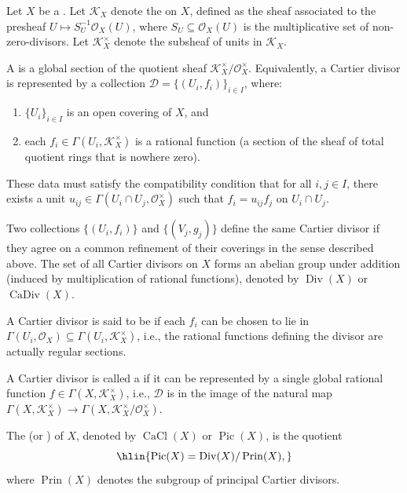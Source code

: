 \begin{definition} \label{definition:cartier_divisor_on_a_scheme}
Let $X$ be a . Let $\mathcal{K}_X$ denote the  on $X$, defined as the sheaf associated to the presheaf $U \mapsto S_U^{-1}\mathcal{O}_X(U)$, where $S_U \subseteq \mathcal{O}_X(U)$ is the multiplicative set of non-zero-divisors. Let $\mathcal{K}_X^\times$ denote the subsheaf of units in $\mathcal{K}_X$.

A  is a global section of the quotient sheaf $\mathcal{K}_X^\times / \mathcal{O}_X^\times$. Equivalently, a Cartier divisor is represented by a collection $\mathcal{D} = \{(U_i, f_i)\}_{i \in I}$, where:
\begin{enumerate}
    \item $\{U_i\}_{i \in I}$ is an open covering of $X$, and
    \item each $f_i \in \Gamma(U_i, \mathcal{K}_X^\times)$ is a rational function (a section of the sheaf of total quotient rings that is nowhere zero).
\end{enumerate}

These data must satisfy the compatibility condition that for all $i, j \in I$, there exists a unit $u_{ij} \in \Gamma(U_i \cap U_j, \mathcal{O}_X^\times)$ such that $f_i = u_{ij} f_j$ on $U_i \cap U_j$.

Two collections $\{(U_i, f_i)\}$ and $\{(V_j, g_j)\}$ define the same Cartier divisor if they agree on a common refinement of their coverings in the sense described above. The set of all Cartier divisors on $X$ forms an abelian group under addition (induced by multiplication of rational functions), denoted by $\operatorname{Div}(X)$ or $\operatorname{CaDiv}(X)$.

A Cartier divisor is said to be  if each $f_i$ can be chosen to lie in $\Gamma(U_i, \mathcal{O}_X) \subseteq \Gamma(U_i, \mathcal{K}_X^\times)$, i.e., the rational functions defining the divisor are actually regular sections.

A Cartier divisor is called a  if it can be represented by a single global rational function $f \in \Gamma(X, \mathcal{K}_X^\times)$, i.e., $\mathcal{D}$ is in the image of the natural map $\Gamma(X, \mathcal{K}_X^\times) \to \Gamma(X, \mathcal{K}_X^\times / \mathcal{O}_X^\times)$.

The  (or ) of $X$, denoted by $\operatorname{CaCl}(X)$ or $\operatorname{Pic}(X)$, is the quotient
$$\hlin{\operatorname{Pic}(X) = \operatorname{Div}(X) / \operatorname{Prin}(X),}$$
where $\operatorname{Prin}(X)$ denotes the subgroup of principal Cartier divisors.


\end{definition}
